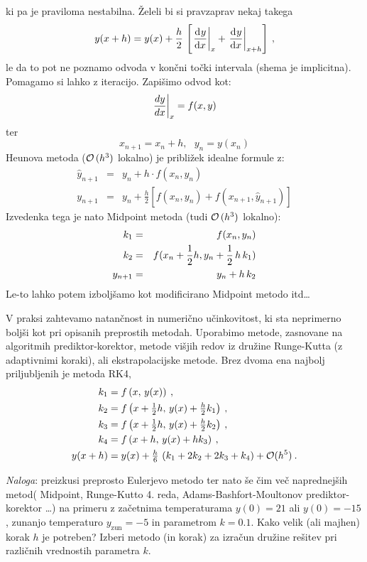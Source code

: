 \documentclass[slovene,11pt,a4paper]{article}
\newcommand{\ddd}{\mathrm{d}}
\newcommand{\Dd}[3][{}]{\frac{\ddd^{#1} #2}{\ddd #3^{#1}}}
\begin{document}
ki pa je praviloma nestabilna.  Želeli bi si
pravzaprav nekaj takega
\begin{equation}
y(x+h) = y(x) + {h\over 2}\,\left[\left.\Dd{y}{x}\right|_x
+ \left.\Dd{y}{x}\right|_{x+h} \right] \>,
\label{impeuler}
\end{equation}
le da to pot ne poznamo odvoda v končni točki intervala
(shema je implicitna). Pomagamo si lahko z iteracijo.
Zapi\v simo odvod kot:
$$ \left.{dy \over dx}\right|_x = f(x,y) $$ ter $$ x_{n+1} = x_n + h,
~~~ y_n = y(x_n)$$
Heunova metoda (${\cal O}\,(h^3 )$ lokalno) je pribli\v zek idealne formule z:
\begin{eqnarray}
\hat{y}_{n+1} & =  & y_n +  h \cdot f(x_n,y_n) \\
y_{n+1} & = & y_n + \frac{h}{2} \left[ f(x_n,y_n) + f(x_{n+1},\hat{y}_{n+1})\right]
\end{eqnarray}
Izvedenka tega je nato Midpoint metoda  (tudi ${\cal O}\,(h^3 )$ lokalno):
\begin{eqnarray}
k_1 & = & f(x_n,y_n) \\
k_2 & = & f(x_n+{1 \over 2}h,y_n+{1 \over 2}\, h\,k_1) \\
y_{n+1} & = & y_n + h\,k_2
\end{eqnarray}
Le-to lahko potem izbolj\v samo kot modificirano Midpoint metodo
itd\ldots

V praksi zahtevamo natančnost in numerično učinkovitost,
ki sta neprimerno boljši kot pri opisanih preprostih metodah.
Uporabimo metode, zasnovane na algoritmih prediktor-korektor,
metode višjih redov iz družine Runge-Kutta (z adaptivnimi koraki), ali ekstrapolacijske metode.
Brez dvoma ena najbolj priljubljenih je metoda RK4,
\begin{align}
k_1 & =
  f\left(x,\,{y}(x)\right) \> {,}\nonumber\\
k_2 & =
  f\left(x+{\textstyle{1\over 2}}h,\,
       {y}(x)+{\textstyle{h\over 2}}k_1\right) \> {,}\nonumber\\
k_3 & =
  f\left(x+{\textstyle{1\over 2}}h,\,
       {y}(x)+{\textstyle{h\over 2}}k_2\right) \> {,}\label{eq:rk4}\\
k_4 & =  f\left(x+h,\,{y}(x)+hk_3\right) \> {,}\nonumber\\
{y}(x+h) & =  {y}(x)
  + {\tfrac{h}{6}}\,\left(k_1 + 2k_2 + 2k_3 + k_4\right) + {\cal O}(h^5)
  \nonumber\> {.}
\end{align}

\bigskip

{\it Naloga\/}: preizkusi preprosto Eulerjevo metodo ter nato še čim več 
naprednejših metod( Midpoint, Runge-Kutto 4. reda, Adams-Bashfort-Moultonov prediktor-korektor \ldots ) na primeru
z začetnima temperaturama $y(0)=21$ ali $y(0)=-15$,
zunanjo temperaturo $y_\mathrm{zun}=-5$ in parametrom $k=0.1$.
Kako velik (ali majhen) korak $h$ je potreben?
Izberi metodo (in korak) za izračun družine rešitev
pri različnih vrednostih parametra $k$.
\end{document}
